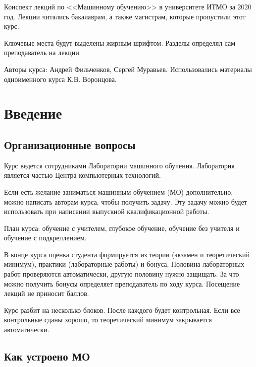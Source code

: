 




Конспект лекций по <<Машинному обучению>> в университете ИТМО за 2020 год.
Лекции читались бакалаврам, а также магистрам, которые пропустили этот курс.

Ключевые места будут выделены жирным шрифтом. Разделы определял сам
преподаватель на лекции.

Авторы курса: Андрей Фильченков, Сергей Муравьев. Использовались материалы
одноименного курса К.В. Воронцова.

\section{Введение}

\subsection{Организационные вопросы}

Курс ведется сотрудниками Лаборатории машинного обучения. Лаборатория является
частью Центра компьютерных технологий.

Если есть желание заниматься машинным обучением (МО) дополнительно, можно
написать авторам курса, чтобы получить задачу. Эту задачу можно будет
использовать при написании выпускной квалификационной работы.

План курса: обучение с учителем, глубокое обучение, обучение без учителя и
обучение с подкреплением.

В конце курса оценка студента формируется из теории (экзамен и теоретический
минимум), практики (лабораторные работы) и бонуса. Половина лабораторных работ
проверяются автоматически, другую половину нужно защищать. За что можно
получить бонусы определяет преподаватель по ходу курса. Посещение лекций не
приносит баллов.

Курс разбит на несколько блоков. После каждого будет контрольная. Если все
контрольные сданы хорошо, то теоретический минимум закрывается автоматически.

\subsection{Как устроено МО}

